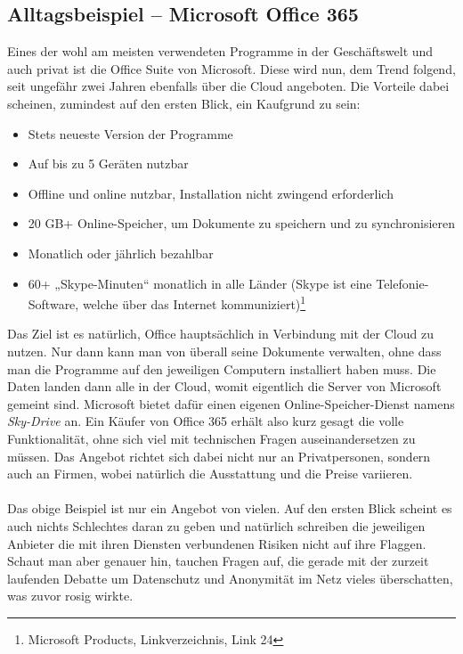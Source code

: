 \subsection{Alltagsbeispiel – Microsoft Office 365}
Eines der wohl am meisten verwendeten Programme in der Geschäftswelt und auch privat ist die Office Suite von Microsoft. Diese wird nun, dem Trend folgend, seit ungefähr zwei Jahren ebenfalls über die Cloud angeboten. Die Vorteile dabei scheinen, zumindest auf den ersten Blick, ein Kaufgrund zu sein:

\begin{itemize}
\item Stets neueste Version der Programme
\item Auf bis zu 5 Geräten nutzbar
\item Offline und online nutzbar, Installation nicht zwingend erforderlich
\item 20 GB+ Online-Speicher, um Dokumente zu speichern und zu synchronisieren
\item Monatlich oder jährlich bezahlbar
\item 60+ „Skype-Minuten“ monatlich in alle Länder (Skype ist eine Telefonie-Software, welche über das Internet kommuniziert)\footnote{Microsoft Products, Linkverzeichnis, Link 24}
\end{itemize}

Das Ziel ist es natürlich, Office hauptsächlich in Verbindung mit der Cloud zu nutzen. Nur dann kann man von überall seine Dokumente verwalten, ohne dass man die Programme auf den jeweiligen Computern installiert haben muss. Die Daten landen dann alle in der Cloud, womit eigentlich die Server von Microsoft gemeint sind. Microsoft bietet dafür einen eigenen Online-Speicher-Dienst namens \textit{Sky-Drive} an. Ein Käufer von Office 365 erhält also kurz gesagt die volle Funktionalität, ohne sich viel mit technischen Fragen auseinandersetzen zu müssen. Das Angebot richtet sich dabei nicht nur an Privatpersonen, sondern auch an Firmen, wobei natürlich die Ausstattung und die Preise variieren.
\\
\\
Das obige Beispiel ist nur ein Angebot von vielen. Auf den ersten Blick scheint es auch nichts Schlechtes daran zu geben und natürlich schreiben die jeweiligen Anbieter die mit ihren Diensten verbundenen Risiken nicht auf ihre Flaggen. Schaut man aber genauer hin, tauchen Fragen auf, die gerade mit der zurzeit laufenden Debatte um Datenschutz und Anonymität im Netz vieles überschatten, was zuvor rosig wirkte.

